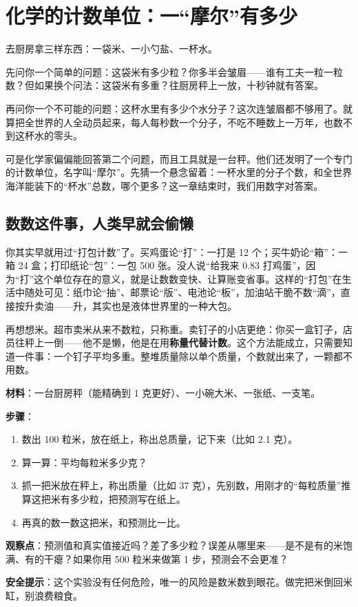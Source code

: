 \chapter{化学的计数单位：一“摩尔”有多少}

\begin{kaichang}
去厨房拿三样东西：一袋米、一小勺盐、一杯水。

先问你一个简单的问题：这袋米有多少粒？你多半会皱眉——谁有工夫一粒一粒数？但如果换个问法：这袋米有多重？往厨房秤上一放，十秒钟就有答案。

再问你一个不可能的问题：这杯水里有多少个水分子？这次连皱眉都不够用了。就算把全世界的人全动员起来，每人每秒数一个分子，不吃不睡数上一万年，也数不到这杯水的零头。

可是化学家偏偏能回答第二个问题，而且工具就是一台秤。他们还发明了一个专门的计数单位，名字叫“摩尔”。先猜一个悬念留着：一杯水里的分子个数，和全世界海洋能装下的“杯水”总数，哪个更多？这一章结束时，我们用数字对答案。
\end{kaichang}

\section{数数这件事，人类早就会偷懒}

你其实早就用过“打包计数”了。买鸡蛋论“打”：一打是 12 个；买牛奶论“箱”：一箱 24 盒；打印纸论“包”：一包 500 张。没人说“给我来 0.83 打鸡蛋”，因为“打”这个单位存在的意义，就是让数数变快、让算账变省事。这样的“打包”在生活中随处可见：纸巾论“抽”、邮票论“版”、电池论“板”，加油站干脆不数“滴”，直接按升卖油——升，其实也是液体世界里的一种大包。

再想想米。超市卖米从来不数粒，只称重。卖钉子的小店更绝：你买一盒钉子，店员往秤上一倒——他不是懒，他是在用\textbf{称量代替计数}。这个方法能成立，只需要知道一件事：一个钉子平均多重。整堆质量除以单个质量，个数就出来了，一颗都不用数。

\begin{shiyan}
\textbf{材料}：一台厨房秤（能精确到 1 克更好）、一小碗大米、一张纸、一支笔。

\textbf{步骤}：
\begin{enumerate}[itemsep=1pt]
\item 数出 100 粒米，放在纸上，称出总质量，记下来（比如 2.1 克）。
\item 算一算：平均每粒米多少克？
\item 抓一把米放在秤上，称出质量（比如 37 克），先别数，用刚才的“每粒质量”推算这把米有多少粒，把预测写在纸上。
\item 再真的数一数这把米，和预测比一比。
\end{enumerate}

\textbf{观察点}：预测值和真实值接近吗？差了多少粒？误差从哪里来——是不是有的米饱满、有的干瘪？如果你用 500 粒米来做第 1 步，预测会不会更准？

\textbf{安全提示}：这个实验没有任何危险，唯一的风险是数米数到眼花。做完把米倒回米缸，别浪费粮食。
\end{shiyan}

